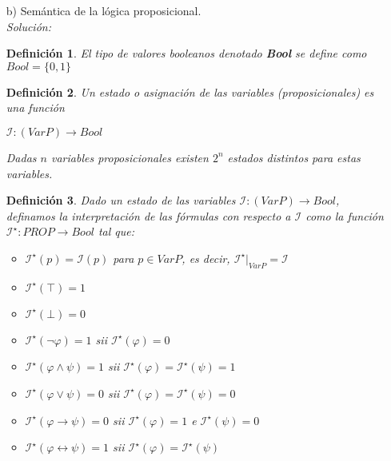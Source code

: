 \documentclass[letterpaper,10pt]{article}
\begin{document}
\begin{enumerate}
\begin{itemize}
            \item[b)] Semántica de la lógica proposicional. \\ 
            \textit{Solución:}
            \newtheorem{teo}{Definición}[]
            \begin{teo} 
                El tipo de valores booleanos denotado \textbf{Bool} se define
                como $Bool = \{0, 1 \}$
            \end{teo}

            \begin{teo}
                Un estado o asignación de las variables (proposicionales) es 
                una función 
                \begin{center}
                    $\mathcal{I} : (Var P) \rightarrow Bool$
                \end{center}
                Dadas $n$ variables proposicionales existen $2^{n}$ estados
                distintos para estas variables.
            \end{teo}

            \begin{teo}
                Dado un estado de las variables 
                $\mathcal{I} : (Var P) \rightarrow Bool$, definamos la
                interpretación de las fórmulas con respecto a $\mathcal{I}$ 
                como la función $\mathcal{I^{\star}} : PROP \rightarrow Bool$
                tal que: 
                \begin{itemize}
                    \item $\mathcal{I^{\star}}(p) = \mathcal{I}(p)$ para 
                    $p \in Var P$, es decir, 
                    $\mathcal{I^{\star}}|_{Var P} = \mathcal{I}$
                    \item $\mathcal{I^{\star}}(\top) = 1$
                    \item $\mathcal{I^{\star}}(\bot) = 0$
                    \item $\mathcal{I^{\star}}(\neg \varphi) = 1$ sii 
                    $\mathcal{I^{\star}}(\varphi) = 0$
                    \item $\mathcal{I^{\star}}(\varphi \land \psi) = 1$
                    sii $\mathcal{I^{\star}}(\varphi) = 
                    \mathcal{I^{\star}}(\psi) = 1$
                    \item $\mathcal{I^{\star}}(\varphi \lor \psi) = 0$
                    sii $\mathcal{I^{\star}}(\varphi) = 
                    \mathcal{I^{\star}}(\psi) = 0$
                    \item $\mathcal{I^{\star}}(\varphi \rightarrow \psi) = 0$
                    sii $\mathcal{I^{\star}}(\varphi) = 1$ e
                    $\mathcal{I^{\star}}(\psi) = 0$
                    \item $\mathcal{I^{\star}}(\varphi \leftrightarrow \psi) = 1$
                    sii $\mathcal{I^{\star}}(\varphi) = 
                    \mathcal{I^{\star}}(\psi)$


\end{itemize}
\end{teo}
\end{itemize}
\end{enumerate}
\end{document}

